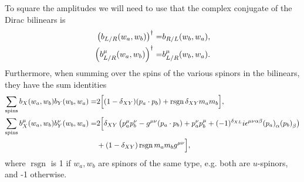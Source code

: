 \documentclass[../main.tex]{subfiles}
\begin{document}
To square the amplitudes we will need to use that the complex conjugate of the Dirac bilinears is
\begin{subequations}
  \label{pc:eq:bilinear_conjugate}
  \begin{align}
    \left(b_{L/R}(w_a, w_b)\right)^\dagger =     & b_{R/L}(w_b, w_a),
    \\
    \left(b_{L/R}^\mu(w_a, w_b)\right)^\dagger = & b_{L/R}^\mu(w_b,
    w_a).
  \end{align}
\end{subequations}
Furthermore, when summing over the spins of the various spinors in the
bilinears, they have the sum identities
\begin{align}
  \label{pc:eq:scalar_bilinear_trace}
  \sum_{\text{spins}} b_X(w_a, w_b) b_Y(w_b, w_a) =         & 2 \Big[
    (1-\delta_{XY}) (p_a \cdot p_b) + \operatorname{rsgn}
    \delta_{XY} m_a m_b
    \Big],
  \\
  \nonumber
  \label{pc:eq:vector_bilinear_trace}
  \sum_{\text{spins}} b_X^\mu(w_a, w_b) b_Y^\nu(w_b, w_a) = & 2\Big[
    \delta_{XY}\pclosed{p_a^\mu p_b^\nu - \g (p_a \cdot p_b) +
      p_a^\nu
      p_b^\mu +
      (-1)^{\delta_{XL}} i \epsilon^{\mu\nu\alpha\beta}
      \tensor{(p_a)}{_\alpha}
  \tensor{(p_b)}{_\beta}}                                             \\
                                                            & +
    (1-\delta_{XY})\operatorname{rsgn} m_a m_b \g \Big],
\end{align}
where \(\operatorname{rsgn}\) is 1 if \(w_a, w_b\) are spinors of the same
type, e.g. both are \(u\)-spinors, and -1 otherwise.
\end{document}
